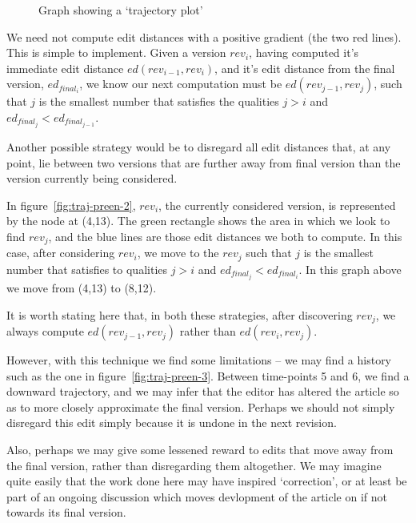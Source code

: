 \begin{wrapfigure}{i}{0.4\textwidth}
  \centering
  \pgfplotsset{width=0.4\textwidth}
  \caption{Graph showing a `trajectory plot'}
  \label{fig:dummy-history}
\end{wrapfigure}

We need not compute edit distances with a positive gradient (the two
red lines). This is simple to implement. Given a version $rev_i$, having
computed it's immediate edit distance $ed(rev_{i-1},rev_i)$, and it's edit
distance from the final version, $ed_{final_i}$, we know our next
computation must be $ed(rev_{j-1},rev_j)$, such that $j$ is the smallest
number that satisfies the qualities $j > i$ and $ed_{final_j} <
ed_{final_{j-1}}$.

Another possible strategy would be to disregard all edit distances
that, at any point, lie between two versions that are further away
from final version than the version currently being considered.

In figure~\ref{fig:traj-preen-2}, $rev_i$, the currently considered
version, is represented by the node at (4,13). The green rectangle
shows the area in which we look to find $rev_j$, and the blue lines
are those edit distances we both to compute. In this case, after
considering $rev_i$, we move to the $rev_j$ such that $j$ is the
smallest number that satisfies to qualities $j > i$ and $ed_{final_j}
< ed_{final_i}$. In this graph above we move from (4,13) to (8,12).

It is worth stating here that, in both these strategies, after
discovering $rev_j$, we always compute $ed(rev_{j-1}, rev_j)$ rather
than $ed(rev_i,rev_j)$. 

However, with this technique we find some limitations -- we may find a
history such as the one in figure~\ref{fig:traj-preen-3}. Between
time-points 5 and 6, we find a downward trajectory, and we may infer
that the editor has altered the article so as to more closely
approximate the final version. Perhaps we should not simply disregard
this edit simply because it is undone in the next revision.

Also, perhaps we may give some lessened reward to edits that move away
from the final version, rather than disregarding them altogether. We
may imagine quite easily that the work done here may have inspired
`correction', or at least be part of an ongoing discussion which moves
devlopment of the article on if not towards its final version.

